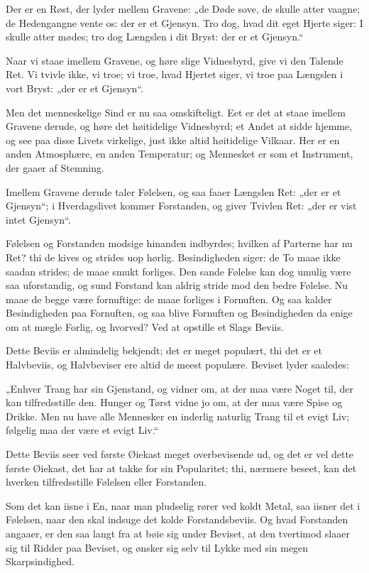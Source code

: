\documentclass[12pt,a4paper]{book}
\newcommand{\apage}[1]{\marginnote{\footnotesize\textit{[#1]}}}
\begin{document}
Der er en Røst, der lyder mellem Gravene: „de Døde sove, de skulle atter
vaagne; de Hedengangne vente os: der er et Gjensyn. Tro dog, hvad dit eget
Hjerte siger: I skulle atter mødes; tro dog Længslen i dit Bryst: der er et
Gjensyn.“

Naar vi staae imellem Gravene, og høre slige Vidnesbyrd, give vi den
Talende Ret. Vi tvivle ikke, vi troe; vi troe, hvad Hjertet siger, vi troe
paa Længslen i vort Bryst: „der er et Gjensyn“.

Men det menneskelige Sind er nu saa omskifteligt. Eet er det at staae
imellem Gravene derude, og høre det høitidelige Vidnesbyrd; et Andet at
sidde hjemme, og see paa disse Livets virkelige, just ikke altid
høitidelige Vilkaar. Her er en anden Atmosphære, en anden Temperatur; og
Mennesket er som et Instrument, der gaaer af Stemning.

Imellem Gravene derude taler Følelsen, og saa faaer Længslen Ret: „der er
et Gjensyn“; i Hverdagslivet kommer Forstanden, og giver Tvivlen Ret: „der
er vist intet Gjensyn“.

Følelsen og Forstanden modsige hinanden indbyrdes; hvilken af Parterne har
nu Ret? thi de kives og strides uop\-%
hørlig. Besindigheden siger: de To maae ikke saadan strides; \apage{24} de maae
smukt forliges. Den sande Følelse kan dog umulig være saa uforstandig, og
sund Forstand kan aldrig stride mod den bedre Følelse. Nu maae de begge
være fornuftige: de maae forliges i Fornuften. Og saa kalder Besindigheden
paa Fornuften, og saa blive Fornuften og Besindigheden da enige om at
mægle Forlig, og hvorved? Ved at opstille et Slags Beviis.

Dette Beviis er almindelig bekjendt; det er meget populært, thi det er et
Halvbeviis, og Halvbeviser ere altid de meest populære. Beviset lyder
saaledes:

„Enhver Trang har sin Gjenstand, og vidner om, at der maa være Noget til,
der kan tilfredsstille den. Hunger og Tørst vidne jo om, at der maa være
Spise og Drikke. Men nu have alle Mennesker en inderlig naturlig Trang til
et evigt Liv; følgelig maa der være et evigt Liv.“

Dette Beviis seer ved første Øiekast meget overbevisende ud, og det er vel
dette første Øiekast, det har at takke for sin Popularitet; thi, nærmere
beseet, kan det hverken tilfredsstille Følelsen eller Forstanden.

Som det kan iisne i En, naar man pludselig rører ved koldt Metal, saa
iisner det i Følelsen, naar den skal indsuge det kolde Forstandsbeviis. Og
hvad Forstanden angaaer, er den saa langt fra at bøie sig under Beviset,
at den tvertimod slaaer sig til Ridder paa Beviset, og ønsker sig selv til
Lykke med sin megen Skarpsindighed.
\end{document}
